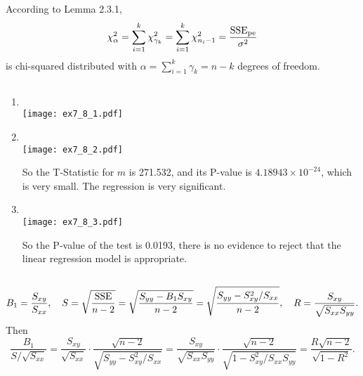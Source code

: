\documentclass[11pt,a4paper]{article}
\begin{document}
According to Lemma 2.3.1, 
$$\chi^2_\alpha=\sum_{i=1}^k\chi^2_{\gamma_k}=\sum_{i=1}^k\chi^2_{n_i-1}=\frac{\rm SSE_{pe}}{\sigma^2}$$
is chi-squared distributed with $\alpha=\sum\limits_{i=1}^k\gamma_k=n-k$ degrees of freedom.

\subsection{}
\begin{enumerate}[label=\roman*)]
\item\ \\
\texttt{[image: ex7\_8\_1.pdf]}
\item\ \\
\texttt{[image: ex7\_8\_2.pdf]}

So the T-Statistic for $m$ is 271.532, and its P-value is $4.18943\times10^{-24}$, which is very small. The regression is very significant.
\item\ \\
\texttt{[image: ex7\_8\_3.pdf]}

So the P-value of the test is 0.0193, there is no evidence to reject that the linear regression model is appropriate.
\end{enumerate}

\subsection{}
$$B_1=\frac{S_{xy}}{S_{xx}},\quad S=\sqrt{\frac{\rm SSE}{n-2}}=\sqrt{\frac{S_{yy}-B_1S_{xy}}{n-2}}=\sqrt{\frac{S_{yy}-S_{xy}^2/S_{xx}}{n-2}},\quad R=\frac{S_{xy}}{\sqrt{S_{xx}S_{yy}}}.$$
Then
$$\frac{B_1}{S/\sqrt{S_{xx}}}=\frac{S_{xy}}{\sqrt{S_{xx}}}\cdot\frac{\sqrt{n-2}}{\sqrt{S_{yy}-S_{xy}^2/S_{xx}}}=\frac{S_{xy}}{\sqrt{S_{xx}S_{yy}}}\cdot\frac{\sqrt{n-2}}{\sqrt{1-S_{xy}^2/S_{xx}S_{yy}}}=\frac{R\sqrt{n-2}}{\sqrt{1-R^2}}.$$
\end{document}
